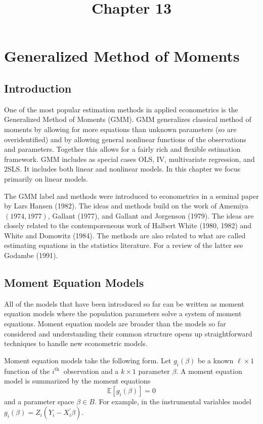 \documentclass[10pt]{article}
\title{Chapter 13 }
\author{}
\date{}
\begin{document}
\maketitle
\section{Generalized Method of Moments}
\subsection{Introduction}
One of the most popular estimation methods in applied econometrics is the Generalized Method of Moments (GMM). GMM generalizes classical method of moments by allowing for more equations than unknown parameters (so are overidentified) and by allowing general nonlinear functions of the observations and parameters. Together this allows for a fairly rich and flexible estimation framework. GMM includes as special cases OLS, IV, multivariate regression, and 2SLS. It includes both linear and nonlinear models. In this chapter we focus primarily on linear models.

The GMM label and methods were introduced to econometrics in a seminal paper by Lars Hansen (1982). The ideas and methods build on the work of Amemiya $(1974,1977)$, Gallant (1977), and Gallant and Jorgenson (1979). The ideas are closely related to the contemporeneous work of Halbert White (1980, 1982) and White and Domowitz (1984). The methods are also related to what are called estimating equations in the statistics literature. For a review of the latter see Godambe (1991).

\subsection{Moment Equation Models}
All of the models that have been introduced so far can be written as moment equation models where the population parameters solve a system of moment equations. Moment equation models are broader than the models so far considered and understanding their common structure opens up straightforward techniques to handle new econometric models.

Moment equation models take the following form. Let $g_{i}(\beta)$ be a known $\ell \times 1$ function of the $i^{\text {th }}$ observation and a $k \times 1$ parameter $\beta$. A moment equation model is summarized by the moment equations
$$
\mathbb{E}\left[g_{i}(\beta)\right]=0
$$
and a parameter space $\beta \in B$. For example, in the instrumental variables model $g_{i}(\beta)=Z_{i}\left(Y_{i}-X_{i}^{\prime} \beta\right)$.
\end{document}
